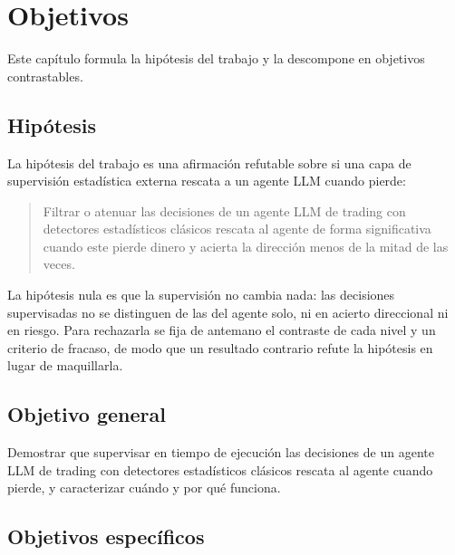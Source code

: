 \chapter{Objetivos}
\label{cap:objetivos}

Este capítulo formula la hipótesis del trabajo y la descompone en objetivos contrastables.

\section{Hipótesis}
\label{sec:obj-hipotesis}

La hipótesis del trabajo es una afirmación refutable sobre si una capa de supervisión estadística externa rescata a un agente LLM cuando pierde:

\begin{quote}
Filtrar o atenuar las decisiones de un agente LLM de trading con detectores estadísticos clásicos rescata al agente de forma significativa cuando este pierde dinero y acierta la dirección menos de la mitad de las veces.
\end{quote}

La hipótesis nula es que la supervisión no cambia nada: las decisiones supervisadas no se distinguen de las del agente solo, ni en acierto direccional ni en riesgo. Para rechazarla se fija de antemano el contraste de cada nivel y un criterio de fracaso, de modo que un resultado contrario refute la hipótesis en lugar de maquillarla.

\section{Objetivo general}
\label{sec:obj-general}

Demostrar que supervisar en tiempo de ejecución las decisiones de un agente LLM de trading con detectores estadísticos clásicos rescata al agente cuando pierde, y caracterizar cuándo y por qué funciona.

\section{Objetivos específicos}
\label{sec:obj-especificos}

